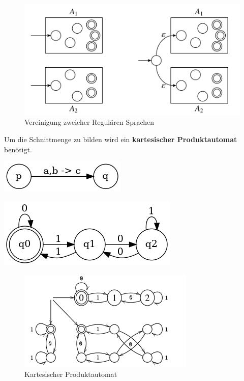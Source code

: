 \documentclass[11pt,twoside,landscape]{article}
\begin{document}
\begin{multicols}{3}
\begin{figure}[htbp]
\centering
\includegraphics[width=.9\linewidth]{img/regulary_lang_cup.png}
\caption{Vereinigung zweicher Regulären Sprachen}
\end{figure}

Um die Schnittmenge zu bilden wird ein \textbf{kartesischer Produktautomat} benötigt.

\begin{center}
\includegraphics[width=.9\linewidth]{img/even_zero_dea.png}
\end{center}

\begin{center}
\includegraphics[width=.9\linewidth]{img/divide_by_3_dea.png}
\end{center}

\begin{figure}[htbp]
\centering
\includegraphics[width=.9\linewidth]{img/kartesischer_automata.png}
\caption{Kartesischer Produktautomat}
\end{figure}

\end{multicols}
\end{document}
